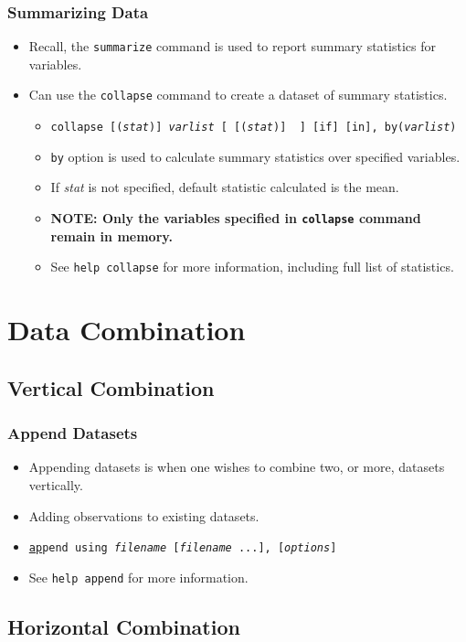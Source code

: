 \documentclass{beamer}
\begin{document}
\begin{frame}
	\frametitle{Summarizing Data}
		\begin{itemize}
			\item Recall, the \texttt{summarize} command is used to report summary statistics for variables.
			\item Can use the \texttt{collapse} command to create a dataset of summary statistics.
				\begin{itemize}
					\item \texttt{collapse [(\textit{stat})] \textit{varlist} [ [(\textit{stat})] \textellipsis~] [if] [in], by(\textit{varlist})}
					\item \texttt{by} option is used to calculate summary statistics over specified variables.
					\item If \textit{stat} is not specified, default statistic calculated is the mean.
					\item \textbf{NOTE: Only the variables specified in \texttt{collapse} command remain in memory.}
					\item See \texttt{help collapse} for more information, including full list of statistics.
				\end{itemize}
		\end{itemize}
\end{frame}

\section{Data Combination}
\subsection{Vertical Combination}

\begin{frame}
	\frametitle{Append Datasets}
		\begin{itemize}
			\item Appending datasets is when one wishes to combine two, or more, datasets vertically.
			\item Adding observations to existing datasets.
			\item \texttt{\underline{ap}pend using \textit{filename} [\textit{filename} ...], [\textit{options}]}
			\item See \texttt{help append} for more information.
		\end{itemize}
\end{frame}

\subsection{Horizontal Combination}
\end{document}
